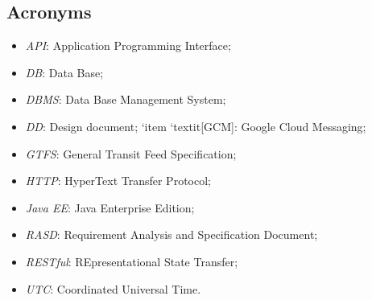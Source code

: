 \subsection{Acronyms}
	\begin{itemize}
	\item \textit{API}: Application Programming Interface;
	\item \textit{DB}: Data Base;
	\item \textit{DBMS}: Data Base Management System;
	\item \textit{DD}: Design document;
	`item `textit[GCM]: Google Cloud Messaging;
	\item \textit{GTFS}: General Transit Feed Specification;
	\item \textit{HTTP}: HyperText Transfer Protocol;
	\item \textit{Java EE}: Java Enterprise Edition;
	\item \textit{RASD}: Requirement Analysis and Specification Document;
	\item \textit{RESTful}: REpresentational State Transfer;
	\item \textit{UTC}: Coordinated Universal Time.
	\end{itemize}
	
